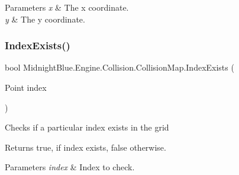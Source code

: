 \begin{DoxyParams}{Parameters}
{\em x} & The x coordinate.\\
\hline
{\em y} & The y coordinate.\\
\hline
\end{DoxyParams}
\hypertarget{class_midnight_blue_1_1_engine_1_1_collision_1_1_collision_map_a5adaed6c764ad94ad8ceca07631cbd93}{}\label{class_midnight_blue_1_1_engine_1_1_collision_1_1_collision_map_a5adaed6c764ad94ad8ceca07631cbd93} 
\subsubsection{\texorpdfstring{Index\+Exists()}{IndexExists()}\hspace{0.1cm}{\footnotesize\ttfamily [2/2]}}
{\footnotesize\ttfamily bool Midnight\+Blue.\+Engine.\+Collision.\+Collision\+Map.\+Index\+Exists (\begin{DoxyParamCaption}\item[{Point}]{index }\end{DoxyParamCaption})\hspace{0.3cm}{\ttfamily [inline]}}



Checks if a particular index exists in the grid 

\begin{DoxyReturn}{Returns}
{\ttfamily true}, if index exists, {\ttfamily false} otherwise.
\end{DoxyReturn}

\begin{DoxyParams}{Parameters}
{\em index} & Index to check.\\
\hline
\end{DoxyParams}
\hypertarget{class_midnight_blue_1_1_engine_1_1_collision_1_1_collision_map_a994b7b33c4573726782cdbcbad785c93}{}\label{class_midnight_blue_1_1_engine_1_1_collision_1_1_collision_map_a994b7b33c4573726782cdbcbad785c93} 
